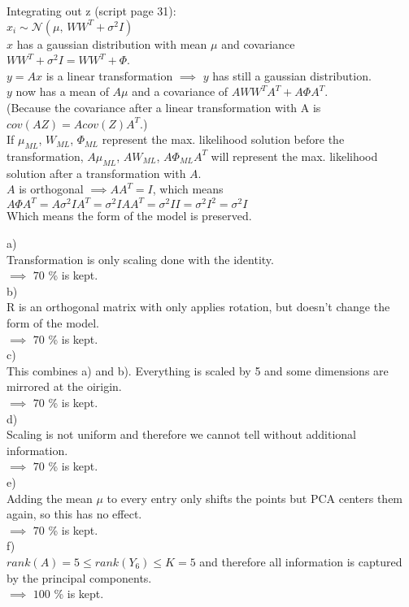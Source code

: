 %
\begin{flushleft}
Integrating out z (script page 31):\\
$x_i \sim \mathcal{N}(\mu, \, W W^{T} + \sigma^{2}I)$\\
$x$ has a gaussian distribution with mean $\mu$ and covariance 
$W W^{T} + \sigma^{2}I = W W^{T} + \Phi$.\\
$y = Ax$ is a linear transformation $\implies$ $y$ has still a gaussian distribution.\\
$y$ now has a mean of $A\mu$ and a covariance of $AW W^{T}A^{T} + A \Phi A^{T}$.\\
(Because the covariance after a linear transformation with A is $cov(AZ)=Acov(Z)A^{T}$.)\\
If $\mu_{ML}$, $W_{ML}$, $\Phi_{ML}$ represent the max. likelihood solution before the transformation, $A\mu_{ML}$, $AW_{ML}$, $A\Phi_{ML}A^{T}$ will represent the max. likelihood solution after a transformation with $A$.\\
$A$ is orthogonal $\implies AA^{T}=I$, which means $A \Phi A^{T} = A \sigma^{2}I A^{T} = \sigma^{2}I A A^{T} = \sigma^{2}I I = \sigma^{2}I^{2} = \sigma^{2}I$\\
Which means the form of the model is preserved.

\end{flushleft}
%
%
%
\begin{flushleft}
a)
\\
Transformation is only scaling done with the identity.
\\ $\implies$ $70$ \% is kept. 
\\
b)
\\
R is an orthogonal matrix with only applies rotation, but doesn't change the form of
the model.
\\ $\implies$ $70$ \% is kept.
\\
c)
\\
This combines a) and b). Everything is scaled by 5 and some dimensions are mirrored at the oirigin.
\\ $\implies$ $70$ \% is kept.
\\
d)
\\
Scaling is not uniform and therefore we cannot tell without additional information.
\\ $\implies$ $70$ \% is kept.
\\
e)
\\
Adding the mean $\mu$ to every entry only shifts the points but PCA centers them again, so this has no effect.
\\ $\implies$ $70$ \% is kept.
\\
f)
\\
$rank(A) = 5 \leq rank(Y_6) \leq K = 5$ and therefore all information is captured by the principal components.
\\ $\implies$ $100$ \% is kept.

\end{flushleft}
